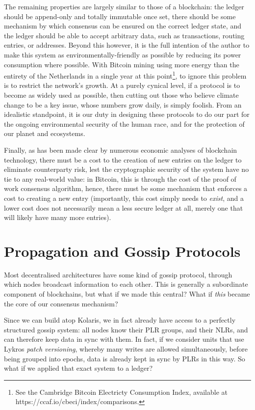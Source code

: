 \documentclass{extreport}
\begin{document}
The remaining properties are largely similar to those of a blockchain: the ledger should be append-only and totally immutable once set, there should be some mechanism by which consensus can be ensured on the correct ledger state, and the ledger should be able to accept arbitrary data, such as transactions, routing entries, or addresses. Beyond this however, it is the full intention of the author to make this system as environmentally-friendly as possible by reducing its power consumption where possible. With Bitcoin mining using more energy than the entirety of the Netherlands in a single year at this point\footnote{See the Cambridge Bitcoin Electricty Consumption Index, available at https://ccaf.io/cbeci/index/comparisons.}, to ignore this problem is to restrict the network's growth. At a purely cynical level, if a protocol is to become as widely used as possible, then cutting out those who believe climate change to be a key issue, whose numbers grow daily, is simply foolish. From an idealistic standpoint, it is our duty in designing these protocols to do our part for the ongoing environmental security of the human race, and for the protection of our planet and ecosystems.

Finally, as has been made clear by numerous economic analyses of blockchain technology, there must be a cost to the creation of new entries on the ledger to eliminate counterparty risk, lest the cryptographic security of the system have no tie to any real-world value: in Bitcoin, this is through the cost of the proof of work consensus algorithm, hence, there must be some mechanism that enforces a cost to creating a new entry (importantly, this cost simply needs to \emph{exist}, and a lower cost does not necessarily mean a less secure ledger at all, merely one that will likely have many more entries).

\chapter{Propagation and Gossip Protocols}
\label{sec:org9c2aa3a}

Most decentralised architectures have some kind of gossip protocol, through which nodes broadcast information to each other. This is generally a subordinate component of blockchains, but what if we made this central? What if \emph{this} became the core of our consensus mechanism?

Since we can build atop Kolaris, we in fact already have access to a perfectly structured gossip system: all nodes know their PLR groups, and their NLRs, and can therefore keep data in sync with them. In fact, if we consider units that use Lykros \emph{patch versioning}, whereby many writes are allowed simultaneously, before being grouped into epochs, data is already kept in sync by PLRs in this way. So what if we applied that exact system to a ledger?
\end{document}
